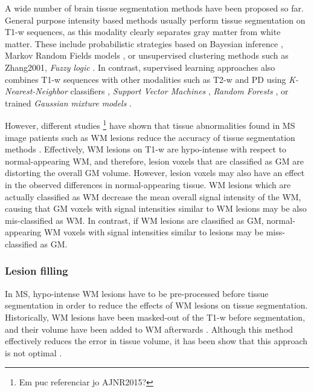 A wide number of brain tissue segmentation methods have been proposed so far. General purpose intensity based methods usually perform tissue segmentation on T1-w sequences, as this modality clearly separates gray matter from white matter. These include probabilistic strategies based on Bayesian inference \cite{Ashburner2005,Marroquin2002, Roy2012,Shattuck2001}, Markov Random Fields models \cite{Bricq2008, Tohka2010, Zhang2001}, or unsupervised clustering methods such as Zhang2001, \textit{Fuzzy logic} \cite{Caldairou2011, Pham2001}. In contrast, supervised learning approaches also combines T1-w sequences with other modalities such as T2-w and PD using \textit{K-Nearest-Neighbor} classifiers \cite{deBoer2009,Vrooman2013}, \textit{Support Vector Machines} \cite{Akselrod2006,Opbroek2013}, \textit{Random Forests} \cite{yi2009,Mahapatra2014}, or trained \textit{Gaussian mixture models} \cite{Rajchl2015}. 

However, different studies \footnote{Em puc referenciar jo AJNR2015?} have shown that tissue abnormalities found in MS image patients such as WM lesions reduce the accuracy of tissue segmentation methods \cite{Battaglini2012, Chard2010}. Effectively, WM lesions on T1-w are hypo-intense with respect to normal-appearing WM, and  therefore, lesion voxels that are classified as GM are distorting the overall GM volume. However, lesion voxels may also have an effect in the observed differences in normal-appearing tissue. WM lesions which are actually classified as WM decrease the mean overall signal intensity of the WM, causing that GM voxels with signal intensities similar to WM lesions may be also mis-classified as WM.  In contrast, if WM lesions are classified as GM, normal-appearing WM voxels with signal intensities similar to lesions may be miss-classified as GM. 
 
\subsubsection{Lesion filling}
\label{subsec:lesion_filling}
In MS, hypo-intense WM lesions have to be pre-processed before tissue segmentation in order to reduce the effects of WM lesions on tissue segmentation. Historically, WM lesions have been masked-out of the T1-w before segmentation, and their volume have been added to WM afterwards \cite{Chard2002}. Although this method effectively reduces the error in tissue volume, it has been show that this approach is not optimal \cite{Battaglini2012, Chard2010}. 

